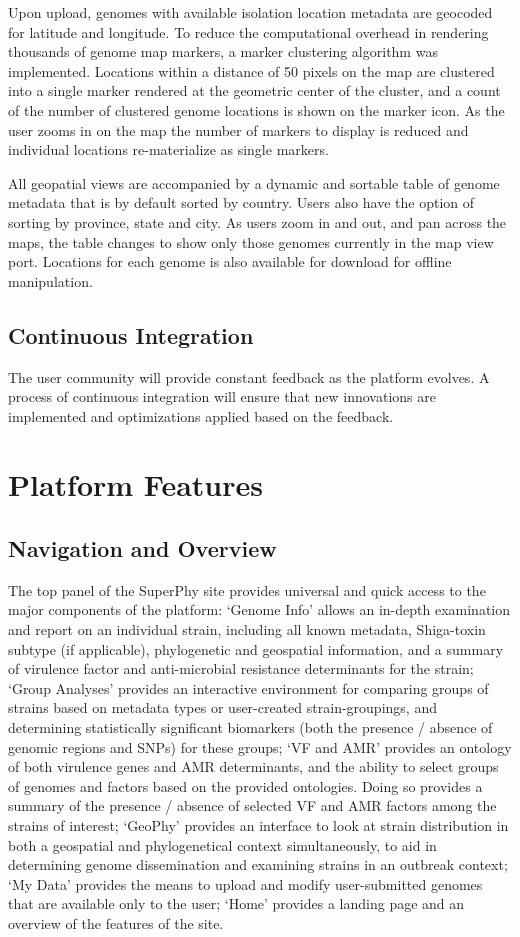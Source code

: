 \documentclass[doublespacing, linenumbers]{bmcart}
\begin{document}
Upon upload, genomes with available isolation location metadata are geocoded for latitude and longitude. To reduce the computational overhead in  rendering thousands of genome map markers, a marker clustering algorithm was implemented. Locations within a distance of 50 pixels on the map are clustered into a single marker rendered at the geometric center of the cluster, and a count of the number of clustered genome locations is shown on the marker icon. As the user zooms in on the map the number of markers to display is reduced and individual locations re-materialize as single markers.

All geopatial views are accompanied by a dynamic and sortable table of genome metadata that is by default sorted by country. Users also have the option of sorting by province, state and city. As users zoom in and out, and pan across the maps, the table changes to show only those genomes currently in the map view port. Locations for each genome is also available for download for offline manipulation.

\subsection{Continuous Integration}
The user community will provide constant feedback as the platform evolves. A process of continuous integration will ensure that new innovations are implemented and optimizations applied based on the feedback.

\section{Platform Features}
\subsection{Navigation and Overview}
The top panel of the SuperPhy site provides universal and quick access to the major components of the platform: `Genome Info'  allows an in-depth examination and report on an individual strain, including all known metadata, Shiga-toxin subtype (if applicable), phylogenetic and geospatial information, and a summary of virulence factor and anti-microbial resistance determinants for the strain; `Group Analyses' provides an interactive environment for comparing groups of strains based on metadata types or user-created strain-groupings, and determining statistically significant biomarkers (both the presence / absence of genomic regions and SNPs) for these groups; `VF and AMR' provides an ontology of both virulence genes and AMR determinants, and the ability to select groups of genomes and factors based on the provided ontologies. Doing so provides a summary of the presence / absence of selected VF and AMR factors among the strains of interest; `GeoPhy' provides an interface to look at strain distribution in both a geospatial and phylogenetical context simultaneously, to aid in determining genome dissemination and examining strains in an outbreak context; `My Data' provides the means to upload and modify user-submitted genomes that are available only to the user; `Home' provides a landing page and an overview of the features of the site. 
\end{document}
